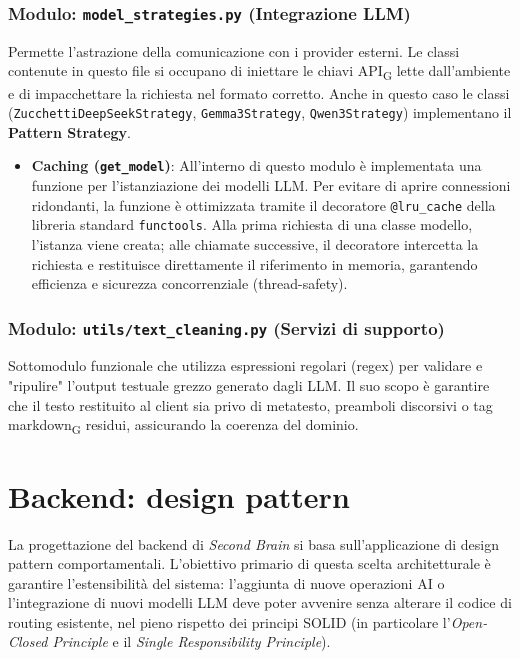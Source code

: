 \documentclass[11pt,a4paper]{article}
\newcommand{\gls}[1]{#1\textsubscript{G}}
\begin{document}
\subsubsection{Modulo: \texttt{model\_strategies.py} (Integrazione LLM)}
Permette l'astrazione della comunicazione con i provider esterni. Le classi contenute in questo file si occupano di iniettare le chiavi \gls{API} lette dall'ambiente e di impacchettare la richiesta nel formato corretto. Anche in questo caso le classi (\texttt{ZucchettiDeepSeekStrategy}, \texttt{Gemma3Strategy}, \texttt{Qwen3Strategy}) implementano il \textbf{Pattern Strategy}.
\begin{itemize}
    \item \textbf{Caching (\texttt{get\_model})}: All'interno di questo modulo è implementata una funzione per l'istanziazione dei modelli LLM. Per evitare di aprire connessioni ridondanti, la funzione è ottimizzata tramite il decoratore \texttt{@lru\_cache} della libreria standard \texttt{functools}. Alla prima richiesta di una classe modello, l'istanza viene creata; alle chiamate successive, il decoratore intercetta la richiesta e restituisce direttamente il riferimento in memoria, garantendo efficienza e sicurezza concorrenziale (thread-safety).
\end{itemize}


\subsubsection{Modulo: \texttt{utils/text\_cleaning.py} (Servizi di supporto)}
Sottomodulo funzionale che utilizza espressioni regolari (regex) per validare e "ripulire" l'output testuale grezzo generato dagli LLM. Il suo scopo è garantire che il testo restituito al client sia privo di metatesto, preamboli discorsivi o tag \gls{markdown} residui, assicurando la coerenza del dominio.

\newpage

\section{Backend: design pattern}
La progettazione del backend di \textit{Second Brain} si basa sull'applicazione di design pattern comportamentali. L'obiettivo primario di questa scelta architetturale è garantire l'estensibilità del sistema: l'aggiunta di nuove operazioni AI o l'integrazione di nuovi modelli LLM deve poter avvenire senza alterare il codice di routing esistente, nel pieno rispetto dei principi SOLID (in particolare l'\textit{Open-Closed Principle} e il \textit{Single Responsibility Principle}).
\end{document}
